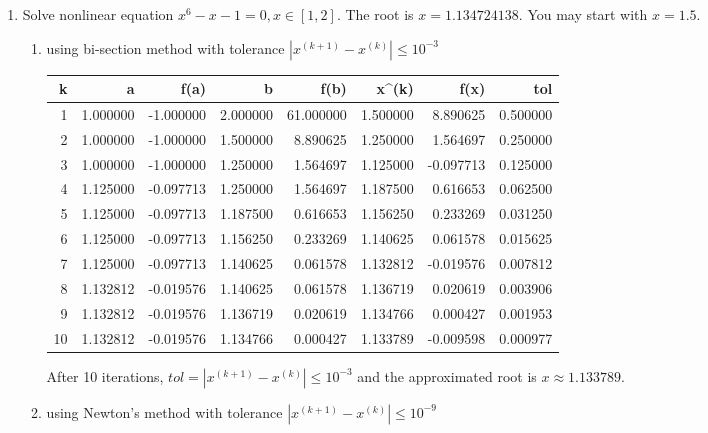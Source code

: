 \documentclass[10pt]{report}
\newcommand{\abs}[1] {\left| #1 \right|}
\begin{document}
\begin{enumerate}
	\item 
	Solve nonlinear equation $x^6 - x - 1 = 0, x\in [1,2]$. The root is $x=1.134724138$. You may start with $x=1.5$.
	\begin{enumerate}
		\item 
		using bi-section method with tolerance $\abs{x^{(k+1)} - x^{(k)}} \le 10^{-3}$
		
		
		\begin{table}[H]
			\centering
			\begin{tabular}{*{8}{N}} \toprule
				k & a & f(a) & b & f(b) & x^{(k)} & f(x) & tol\\  & 1.000000 & -1.000000 & 2.000000 & 61.000000 & 1.500000 & 8.890625 & 0.500000\\
				2 & 1.000000 & -1.000000 & 1.500000 & 8.890625 & 1.250000 & 1.564697 & 0.250000\\
				3 & 1.000000 & -1.000000 & 1.250000 & 1.564697 & 1.125000 & -0.097713 & 0.125000\\
				4 & 1.125000 & -0.097713 & 1.250000 & 1.564697 & 1.187500 & 0.616653 & 0.062500\\
				5 & 1.125000 & -0.097713 & 1.187500 & 0.616653 & 1.156250 & 0.233269 & 0.031250\\
				6 & 1.125000 & -0.097713 & 1.156250 & 0.233269 & 1.140625 & 0.061578 & 0.015625\\
				7 & 1.125000 & -0.097713 & 1.140625 & 0.061578 & 1.132812 & -0.019576 & 0.007812\\
				8 & 1.132812 & -0.019576 & 1.140625 & 0.061578 & 1.136719 & 0.020619 & 0.003906\\
				9 & 1.132812 & -0.019576 & 1.136719 & 0.020619 & 1.134766 & 0.000427 & 0.001953\\
				10 & 1.132812 & -0.019576 & 1.134766 & 0.000427 & 1.133789 & -0.009598 & 0.000977\\
				\bottomrule
			\end{tabular}
		\end{table}
		After 10 iterations, $tol = \abs{x^{(k+1)} - x^{(k)}} \le 10^{-3}$ and the approximated root is $x\approx 1.133789$.

		\item 
		using Newton's method with tolerance $\abs{x^{(k+1)} - x^{(k)}} \le 10^{-9}$
		

\end{enumerate}
\end{enumerate}
\end{document}
